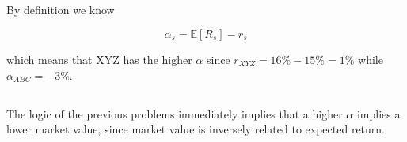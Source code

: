 \documentclass[12pt, letterpaper, parskip = full]{article}
\newcommand{\Ex}[1]{\mathbb{E}\left[#1\right]}
\begin{document}
    \subsection{}

    By definition we know 

    \[ \alpha_s = \Ex{R_s} - r_s \]

    which means that XYZ has the higher \(\alpha\) since \(r_{XYZ} = 16\% - 15\% = 1\%\) while \(\alpha_{ABC} = -3\%\).
    
    \subsection{}

    The logic of the previous problems immediately implies that a higher \(\alpha\) implies a lower market value, since market value is inversely related to expected return.
\end{document}
